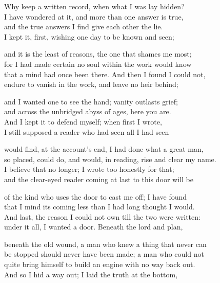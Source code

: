 \begin{founder}
Why keep a written record, when what I was lay hidden?\\
I have wondered at it, and more than one answer is true,\\
and the true answers I find give each other the lie.\\
I kept it, first, wishing one day to be known and seen;\\
\medskip

and it is the least of reasons, the one that shames me most;\\
for I had made certain no soul within the work would know\\
that a mind had once been there. And then I found I could not,\\
endure to vanish in the work, and leave no heir behind;\\
\medskip

and I wanted one to see the hand; vanity outlasts grief;\\
and across the unbridged abyss of ages, here you are.\\
And I kept it to defend myself; when first I wrote,\\
I still supposed a reader who had seen all I had seen\\
\medskip

would find, at the account's end, I had done what a great man,\\
so placed, could do, and would, in reading, rise and clear my name.\\
I believe that no longer; I wrote too honestly for that;\\
and the clear-eyed reader coming at last to this door will be\\
\medskip

of the kind who uses the door to cast me off; I have found\\
that I mind its coming less than I had long thought I would.\\
And last, the reason I could not own till the two were written:\\
under it all, I wanted a door. Beneath the lord and plan,\\
\medskip

beneath the old wound, a man who knew a thing that never can\\
be stopped should never have been made; a man who could not\\
quite bring himself to build an engine with no way back out.\\
And so I hid a way out; I laid the truth at the bottom,\\
\medskip


\end{founder}
